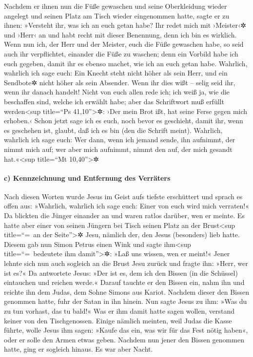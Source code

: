  Nachdem er ihnen nun die Füße gewaschen und seine
Oberkleidung wieder angelegt und seinen Platz am Tisch wieder
eingenommen hatte, sagte er zu ihnen: »Versteht ihr, was ich an euch
getan habe?  Ihr redet mich mit ›Meister‹✲ und ›Herr‹ an
und habt recht mit dieser Benennung, denn ich bin es wirklich.
 Wenn nun ich, der Herr und der Meister, euch die Füße
gewaschen habe, so seid auch ihr verpflichtet, einander die Füße zu
waschen;  denn ein Vorbild habe ich euch gegeben, damit
ihr es ebenso machet, wie ich an euch getan habe. 
Wahrlich, wahrlich ich sage euch: Ein Knecht steht nicht höher als sein
Herr, und ein Sendbote✲ nicht höher als sein Absender. 
Wenn ihr dies wißt -- selig seid ihr, wenn ihr danach handelt!
 Nicht von euch allen rede ich; ich weiß ja, wie die
beschaffen sind, welche ich erwählt habe; aber das Schriftwort muß
erfüllt werden\textless sup title=``Ps 41,10''\textgreater✲: ›Der mein
Brot ißt, hat seine Ferse gegen mich erhoben.‹  Schon
jetzt sage ich es euch, noch bevor es geschieht, damit ihr, wenn es
geschehen ist, glaubt, daß ich es bin (den die Schrift meint).
 Wahrlich, wahrlich ich sage euch: Wer dann, wenn ich
jemand sende, ihn aufnimmt, der nimmt mich auf; wer aber mich aufnimmt,
nimmt den auf, der mich gesandt hat.«\textless sup title=``Mt
10,40''\textgreater✲

\hypertarget{c-kennzeichnung-und-entfernung-des-verruxe4ters}{%
\paragraph{c) Kennzeichnung und Entfernung des
Verräters}\label{c-kennzeichnung-und-entfernung-des-verruxe4ters}}

 Nach diesen Worten wurde Jesus im Geist aufs tiefste
erschüttert und sprach es offen aus: »Wahrlich, wahrlich ich sage euch:
Einer von euch wird mich verraten!«  Da blickten die
Jünger einander an und waren ratlos darüber, wen er meinte.
 Es hatte aber einer von seinen Jüngern bei Tisch seinen
Platz an der Brust\textless sup title=``=~an der Seite''\textgreater✲
Jesu, nämlich der, den Jesus (besonders) lieb hatte. 
Diesem gab nun Simon Petrus einen Wink und sagte ihm\textless sup
title=``=~bedeutete ihm damit''\textgreater✲: »Laß uns wissen, wen er
meint!«  Jener lehnte sich nun auch sogleich an die Brust
Jesu zurück und fragte ihn: »Herr, wer ist es?«  Da
antwortete Jesus: »Der ist es, dem ich den Bissen (in die Schüssel)
eintauchen und reichen werde.« Darauf tauchte er den Bissen ein, nahm
ihn und reichte ihn dem Judas, dem Sohne Simons aus Kariot.
 Nachdem dieser den Bissen genommen hatte, fuhr der Satan
in ihn hinein. Nun sagte Jesus zu ihm: »Was du zu tun vorhast, das tu
bald!«  Was er ihm damit hatte sagen wollen, verstand
keiner von den Tischgenossen.  Einige nämlich meinten,
weil Judas die Kasse führte, wolle Jesus ihm sagen: »Kaufe das ein, was
wir für das Fest nötig haben«, oder er solle den Armen etwas geben.
 Nachdem nun jener den Bissen genommen hatte, ging er
sogleich hinaus. Es war aber Nacht.

